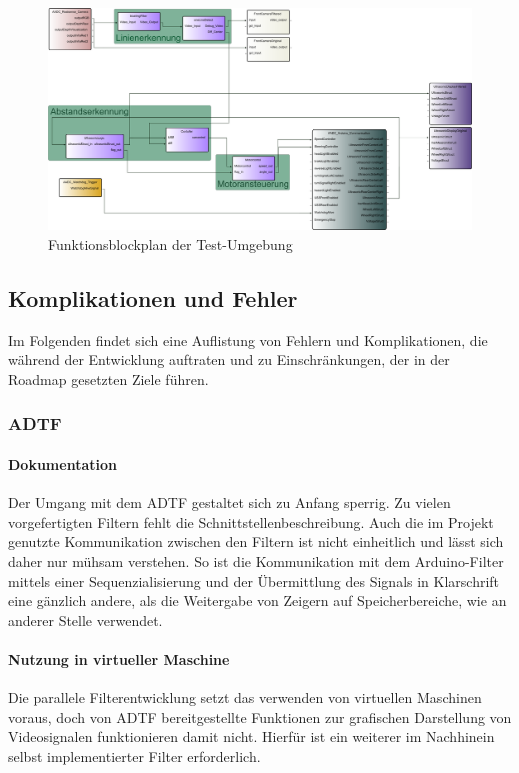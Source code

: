 \documentclass[12pt, a4paper]{scrartcl}
\begin{document}
\begin{figure}[ht]
	\centering
	\includegraphics[width=\textwidth, height=\textheight, keepaspectratio]{Bilder/FunktionsblockplanE.png}
	\caption{Funktionsblockplan der Test-Umgebung}
	\label{img:funktionsblockplan}
\end{figure}


\subsection{Komplikationen und Fehler}
Im Folgenden findet sich eine Auflistung von Fehlern und Komplikationen, die während der Entwicklung auftraten und zu Einschränkungen, der in der Roadmap gesetzten Ziele führen.

\subsubsection{ADTF}
\paragraph{Dokumentation}
Der Umgang mit dem ADTF gestaltet sich zu Anfang sperrig. Zu vielen vorgefertigten Filtern fehlt die Schnittstellenbeschreibung. Auch die im Projekt genutzte Kommunikation zwischen den Filtern ist nicht einheitlich und lässt sich daher nur mühsam verstehen. So ist die Kommunikation mit dem Arduino-Filter mittels einer Sequenzialisierung und der Übermittlung des Signals in Klarschrift eine gänzlich andere, als die Weitergabe von Zeigern auf Speicherbereiche, wie an anderer Stelle verwendet.

\paragraph{Nutzung in virtueller Maschine}
Die parallele Filterentwicklung setzt das verwenden von virtuellen Maschinen voraus, doch von ADTF bereitgestellte Funktionen zur grafischen Darstellung von Videosignalen funktionieren damit nicht. Hierfür ist ein weiterer im Nachhinein selbst implementierter Filter erforderlich.
\end{document}
